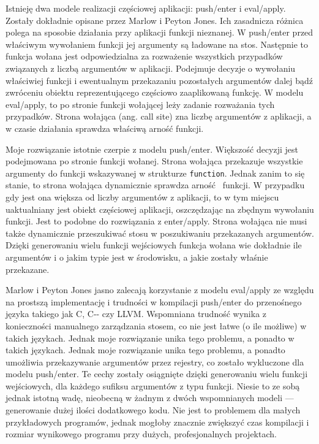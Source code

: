 \documentclass[declaration,shortabstract]{iithesis}
\begin{document}
Istnieję dwa modele realizacji częściowej aplikacji: push/enter i eval/apply. 
Zostały dokładnie opisane przez Marlow i Peyton Jones\cite{fast_curry}. 
Ich zasadnicza różnica polega na sposobie działania przy aplikacji funkcji 
nieznanej. W push/enter przed właściwym wywołaniem funkcji jej argumenty są 
ładowane na stos. Następnie to funkcja wołana jest odpowiedzialna za
rozważenie wszystkich przypadków związanych z liczbą argumentów w aplikacji.
Podejmuje decyzje o wywołaniu właściwiej funkcji i ewentualnym przekazaniu 
pozostałych argumentów dalej bądź zwróceniu obiektu reprezentującego częściowo
zaaplikowaną funkcję. W modelu eval/apply, to po stronie funkcji wołającej 
leży zadanie rozważania tych przypadków. Strona wołająca (ang. call site)
zna liczbę argumentów z aplikacji, a w czasie działania sprawdza 
właściwą arność funkcji. 

Moje rozwiązanie istotnie czerpie z modelu push/enter. Większość decyzji
jest podejmowana po stronie funkcji wołanej. Strona wołająca przekazuje 
wszystkie argumenty do funkcji wskazywanej w strukturze \texttt{function}. 
Jednak zanim to się stanie, to strona wołająca dynamicznie sprawdza arność 
funkcji. W przypadku gdy jest ona większa od liczby argumentów z aplikacji, 
to w tym miejscu uaktualniany jest obiekt częściowej aplikacji, oszczędzając 
na zbędnym wywołaniu funkcji. Jest to podobne do rozwiązania z enter/apply.
Strona wołająca nie musi także dynamicznie przeszukiwać stosu w poszukiwaniu 
przekazanych argumentów. Dzięki generowaniu wielu funkcji wejściowych funkcja 
wołana wie dokładnie ile argumentów i o jakim typie jest w środowisku, a jakie 
zostały właśnie przekazane. 

Marlow i Peyton Jones \cite{fast_curry} jasno zalecają korzystanie z 
modelu eval/apply ze względu na 
prostszą implementację i trudności w kompilacji push/enter do przenośnego 
języka takiego jak C, C-{}- czy LLVM. Wspomniana trudność wynika z 
konieczności manualnego zarządzania stosem, co nie jest łatwe (o ile możliwe) 
w takich językach. Jednak moje rozwiązanie unika tego problemu, a ponadto
w takich językach. Jednak moje rozwiązanie unika tego problemu, a ponadto
umożliwia przekazywanie argumentów przez rejestry, co zostało wykluczone dla 
modelu push/enter. Te cechy zostały osiągnięte dzięki generowaniu wielu funkcji 
wejściowych, dla każdego sufiksu argumentów z typu funkcji. Niesie to ze sobą 
jednak istotną wadę, nieobecną w żadnym z dwóch wspomnianych modeli --- 
generowanie dużej ilości dodatkowego kodu. Nie jest to problemem dla małych 
przykładowych programów, jednak mogłoby znacznie zwiększyć czas kompilacji i 
rozmiar wynikowego programu przy dużych, profesjonalnych projektach.
\end{document}
